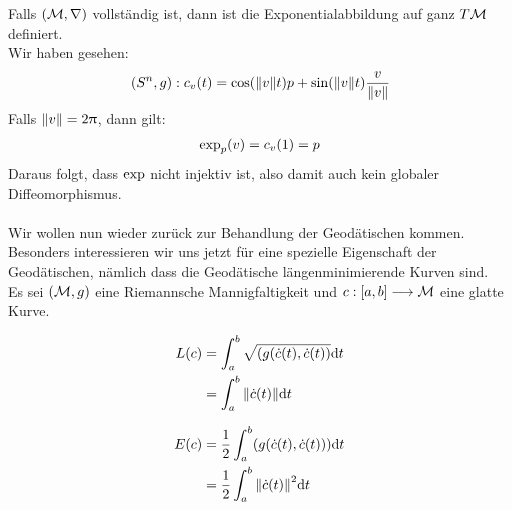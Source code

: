 Falls $(\mathcal{M}, \nabla)$ vollständig ist, dann ist die Exponentialabbildung auf ganz $T\mathcal{M}$ definiert. \\
Wir haben gesehen: 
\begin{align*}
(S^n, g): c_v(t) = \cos(\norm{v}t) p + \sin(\norm{v}t)\frac{v}{\norm{v}}
\end{align*}
Falls $\norm{v}=2\uppi$, dann gilt:
\begin{align*}
\operatorname{exp}_p(v) = c_v(1)=p
\end{align*} 
Daraus folgt, dass $\operatorname{exp}$ nicht injektiv ist, also damit auch kein globaler Diffeomorphismus. \\
\phantom{.} \\
Wir wollen nun wieder zurück zur Behandlung der Geodätischen kommen. Besonders interessieren wir uns jetzt für eine spezielle Eigenschaft der Geodätischen, nämlich dass die Geodätische längenminimierende Kurven sind. \\
Es sei $(\mathcal{M}, g)$ eine Riemannsche Mannigfaltigkeit und $c:[a, b] \longrightarrow \mathcal{M}$ eine glatte Kurve.
\begin{defs}
\begin{align}
L(c) &= \int_{a}^{b}\sqrt{(g(\dot{c}(t), \dot{c}(t))} \dd t  \nonumber \\
&= \int_{a}^{b} \norm{\dot{c}(t)} \dd t
\end{align}
\end{defs}
\begin{defs}
\begin{align}
E(c) &= \frac{1}{2}\int_{a}^{b}(g(\dot{c}(t),\dot{c}(t))) \dd t \\
&= \frac{1}{2}\int_{a}^{b} \norm{\dot{c}(t)}^2 \dd t
\end{align}
\end{defs}


